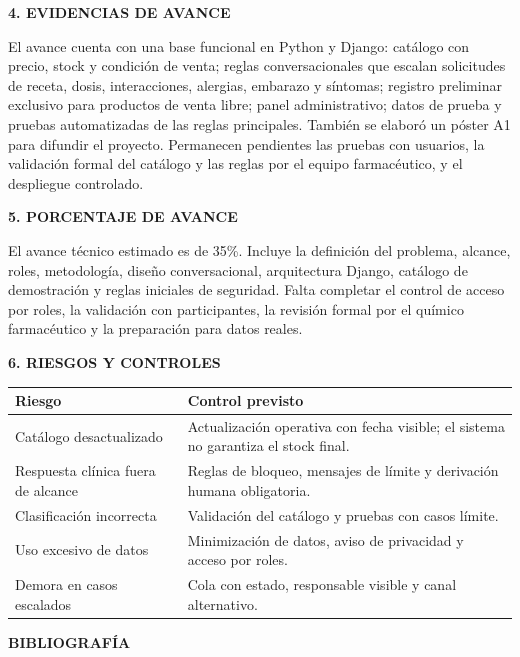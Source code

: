 \documentclass[11pt,a4paper]{article}
\newcommand{\capitulo}[1]{\vspace{1.2em}\noindent\textbf{\large #1}\par\vspace{0.45em}}
\newcommand{\apartado}[1]{\vspace{0.85em}\noindent\textbf{#1}\par\vspace{0.3em}}
\begin{document}
\apartado{4. EVIDENCIAS DE AVANCE}

El avance cuenta con una base funcional en Python y Django: catálogo con precio, stock y condición de venta; reglas conversacionales que escalan solicitudes de receta, dosis, interacciones, alergias, embarazo y síntomas; registro preliminar exclusivo para productos de venta libre; panel administrativo; datos de prueba y pruebas automatizadas de las reglas principales. También se elaboró un póster A1 para difundir el proyecto. Permanecen pendientes las pruebas con usuarios, la validación formal del catálogo y las reglas por el equipo farmacéutico, y el despliegue controlado.

\apartado{5. PORCENTAJE DE AVANCE}

El avance técnico estimado es de 35\%. Incluye la definición del problema, alcance, roles, metodología, diseño conversacional, arquitectura Django, catálogo de demostración y reglas iniciales de seguridad. Falta completar el control de acceso por roles, la validación con participantes, la revisión formal por el químico farmacéutico y la preparación para datos reales.

\apartado{6. RIESGOS Y CONTROLES}

\begin{table}[h!]
\centering
\small
\begin{tabularx}{\textwidth}{p{}Y}
\toprule
\textbf{Riesgo} & \textbf{Control previsto} \\
\midrule
Catálogo desactualizado & Actualización operativa con fecha visible; el sistema no garantiza el stock final. \\
Respuesta clínica fuera de alcance & Reglas de bloqueo, mensajes de límite y derivación humana obligatoria. \\
Clasificación incorrecta & Validación del catálogo y pruebas con casos límite. \\
Uso excesivo de datos & Minimización de datos, aviso de privacidad y acceso por roles. \\
Demora en casos escalados & Cola con estado, responsable visible y canal alternativo. \\
\bottomrule
\end{tabularx}
\end{table}

\capitulo{BIBLIOGRAFÍA}
\end{document}
